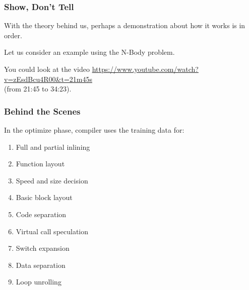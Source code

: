 \begin{frame}
\frametitle{Show, Don't Tell}

\large
\begin{changemargin}{2cm}
With the theory behind us, perhaps a demonstration about how it works is in order. 

Let us consider an example using the N-Body problem. 

You could look at the video \url{https://www.youtube.com/watch?v=zEsdBcu4R00&t=21m45s}\\ (from 21:45 to 34:23).

\end{changemargin}

\end{frame}



\begin{frame}
\frametitle{Behind the Scenes}

\large
\begin{changemargin}{2cm}
In the optimize phase, compiler uses the training data for:

\begin{enumerate}
\item Full and partial inlining
\item Function layout
\item Speed and size decision
\item Basic block layout 
\item Code separation
\item Virtual call speculation
\item Switch expansion
\item Data separation
\item Loop unrolling
\end{enumerate}
\end{changemargin}
\end{frame}



